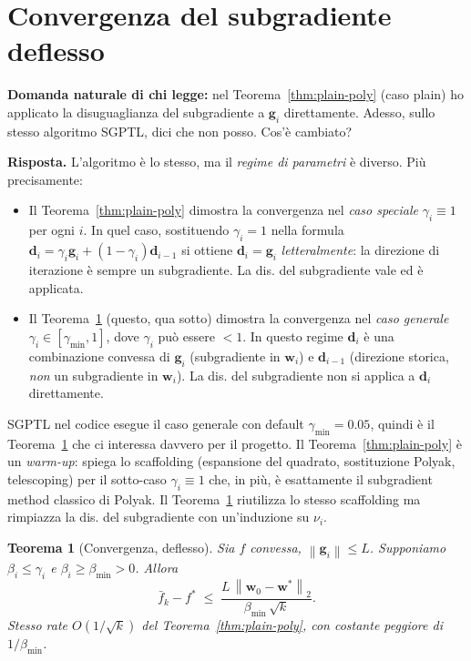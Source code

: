\documentclass[11pt,a4paper]{article}
\newcommand{\norm}[1]{\left\|#1\right\|}
\newcommand{\bw}{\mathbf{w}}
\newcommand{\bg}{\mathbf{g}}
\newcommand{\bd}{\mathbf{d}}
\newtheorem{theorem}{Teorema}[section]
\theoremstyle{definition}
\begin{document}
\section{Convergenza del subgradiente deflesso}
\label{sec:def-convergence}

\begin{tcolorbox}[warning]
\textbf{Domanda naturale di chi legge:} nel Teorema~\ref{thm:plain-poly} (caso plain) ho applicato la disuguaglianza del subgradiente a $\bg_i$ direttamente. Adesso, sullo stesso algoritmo SGPTL, dici che non posso. Cos'è cambiato?

\textbf{Risposta.} L'algoritmo è lo stesso, ma il \emph{regime di parametri} è diverso. Più precisamente:
\begin{itemize}[leftmargin=*]
\item Il Teorema~\ref{thm:plain-poly} dimostra la convergenza nel \emph{caso speciale} $\gamma_i \equiv 1$ per ogni $i$. In quel caso, sostituendo $\gamma_i=1$ nella formula $\bd_i = \gamma_i\bg_i + (1-\gamma_i)\bd_{i-1}$ si ottiene $\bd_i = \bg_i$ \emph{letteralmente}: la direzione di iterazione è sempre un subgradiente. La dis. del subgradiente vale ed è applicata.
\item Il Teorema~\ref{thm:def} (questo, qua sotto) dimostra la convergenza nel \emph{caso generale} $\gamma_i \in [\gamma_{\min}, 1]$, dove $\gamma_i$ può essere $<1$. In questo regime $\bd_i$ è una combinazione convessa di $\bg_i$ (subgradiente in $\bw_i$) e $\bd_{i-1}$ (direzione storica, \emph{non} un subgradiente in $\bw_i$). La dis. del subgradiente non si applica a $\bd_i$ direttamente.
\end{itemize}
SGPTL nel codice esegue il caso generale con default $\gamma_{\min} = 0.05$, quindi è il Teorema~\ref{thm:def} che ci interessa davvero per il progetto. Il Teorema~\ref{thm:plain-poly} è un \emph{warm-up}: spiega lo scaffolding (espansione del quadrato, sostituzione Polyak, telescoping) per il sotto-caso $\gamma_i\equiv 1$ che, in più, è esattamente il subgradient method classico di Polyak. Il Teorema~\ref{thm:def} riutilizza lo stesso scaffolding ma rimpiazza la dis. del subgradiente con un'induzione su $\nu_i$.
\end{tcolorbox}

\begin{theorem}[Convergenza, deflesso]
\label{thm:def}
Sia $f$ convessa, $\norm{\bg_i}\le L$. Supponiamo $\beta_i\le\gamma_i$ e $\beta_i\ge\beta_{\min}>0$. Allora
\begin{equation}
\label{eq:def-rate}
\bar f_k - f^* \;\le\; \frac{L\,\norm{\bw_0-\bw^*}_2}{\beta_{\min}\,\sqrt{k}}.
\end{equation}
Stesso rate $O(1/\sqrt{k})$ del Teorema~\ref{thm:plain-poly}, con costante peggiore di $1/\beta_{\min}$.
\end{theorem}
\end{document}
